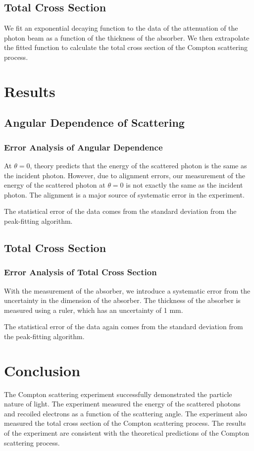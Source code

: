 \subsection{Total Cross Section}
We fit an exponential decaying function to the data of the attenuation of the photon beam as a function of the thickness of the absorber. We then extrapolate the fitted function to calculate the total cross section of the Compton scattering process. 

\section{Results}
\subsection{Angular Dependence of Scattering}
\subsubsection{Error Analysis of Angular Dependence}
At $\theta = 0$, theory predicts that the energy of the scattered photon is the same as the incident photon. However, due to alignment errors, our measurement of the energy of the scattered photon at $\theta = 0$ is not exactly the same as the incident photon. The alignment is a major source of systematic error in the experiment.

The statistical error of the data comes from the standard deviation from the peak-fitting algorithm. 

\subsection{Total Cross Section}
\subsubsection{Error Analysis of Total Cross Section}
With the measurement of the absorber, we introduce a systematic error from the uncertainty in the dimension of the absorber. The thickness of the absorber is measured using a ruler, which has an uncertainty of 1 mm. 

The statistical error of the data again comes from the standard deviation from the peak-fitting algorithm.



 

\section{Conclusion}
The Compton scattering experiment successfully demonstrated the particle nature of light. The experiment measured the energy of the scattered photons and recoiled electrons as a function of the scattering angle. The experiment also measured the total cross section of the Compton scattering process. The results of the experiment are consistent with the theoretical predictions of the Compton scattering process.

